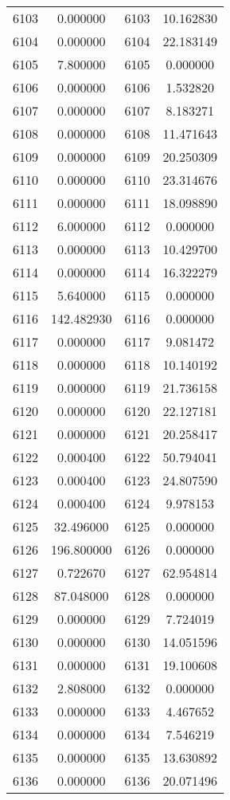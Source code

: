 \documentclass[12pt]{article}
\begin{document}
\begin{longtable}{@{}cccc@{}}
6103 & 0.000000 & 6103 & 10.162830 \\
6104 & 0.000000 & 6104 & 22.183149 \\
6105 & 7.800000 & 6105 & 0.000000 \\
6106 & 0.000000 & 6106 & 1.532820 \\
6107 & 0.000000 & 6107 & 8.183271 \\
6108 & 0.000000 & 6108 & 11.471643 \\
6109 & 0.000000 & 6109 & 20.250309 \\
6110 & 0.000000 & 6110 & 23.314676 \\
6111 & 0.000000 & 6111 & 18.098890 \\
6112 & 6.000000 & 6112 & 0.000000 \\
6113 & 0.000000 & 6113 & 10.429700 \\
6114 & 0.000000 & 6114 & 16.322279 \\
6115 & 5.640000 & 6115 & 0.000000 \\
6116 & 142.482930 & 6116 & 0.000000 \\
6117 & 0.000000 & 6117 & 9.081472 \\
6118 & 0.000000 & 6118 & 10.140192 \\
6119 & 0.000000 & 6119 & 21.736158 \\
6120 & 0.000000 & 6120 & 22.127181 \\
6121 & 0.000000 & 6121 & 20.258417 \\
6122 & 0.000400 & 6122 & 50.794041 \\
6123 & 0.000400 & 6123 & 24.807590 \\
6124 & 0.000400 & 6124 & 9.978153 \\
6125 & 32.496000 & 6125 & 0.000000 \\
6126 & 196.800000 & 6126 & 0.000000 \\
6127 & 0.722670 & 6127 & 62.954814 \\
6128 & 87.048000 & 6128 & 0.000000 \\
6129 & 0.000000 & 6129 & 7.724019 \\
6130 & 0.000000 & 6130 & 14.051596 \\
6131 & 0.000000 & 6131 & 19.100608 \\
6132 & 2.808000 & 6132 & 0.000000 \\
6133 & 0.000000 & 6133 & 4.467652 \\
6134 & 0.000000 & 6134 & 7.546219 \\
6135 & 0.000000 & 6135 & 13.630892 \\
6136 & 0.000000 & 6136 & 20.071496 \\

\end{longtable}
\end{document}
